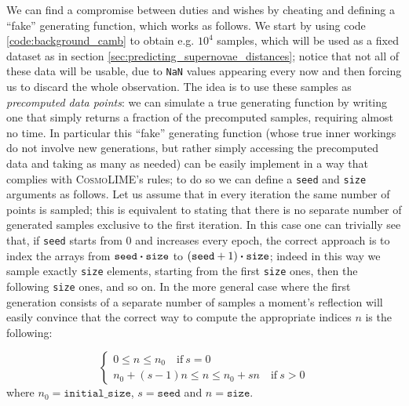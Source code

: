 We can find a compromise between duties and wishes by cheating and defining a ``fake'' generating function, which works as follows.
We start by using code \ref{code:background_camb} to obtain e.g. $10^4$ samples, which will be used as a fixed dataset as in section \ref{sec:predicting_supernovae_distances}; notice that not all of these data will be usable, due to \texttt{NaN} values appearing every now and then forcing us to discard the whole observation.
The idea is to use these samples as \emph{precomputed data points}: we can simulate a true generating function by writing one that simply returns a fraction of the precomputed samples, requiring almost no time.
In particular this ``fake'' generating function (whose true inner workings do not involve new generations, but rather simply accessing the precomputed data and taking as many as needed) can be easily implement in a way that complies with \textsc{CosmoLIME}'s rules; to do so we can define a \texttt{seed} and \texttt{size} arguments as follows.
Let us assume that in every iteration the same number of points is sampled; this is equivalent to stating that there is no separate number of generated samples exclusive to the first iteration. In this case one can trivially see that, if \texttt{seed} starts from $0$ and increases every epoch, the correct approach is to index the arrays from $\texttt{seed}\vdot \texttt{size}$ to $(\texttt{seed}+1)\vdot\texttt{size}$; indeed in this way we sample exactly \texttt{size} elements, starting from the first \texttt{size} ones, then the following \texttt{size} ones, and so on.
In the more general case where the first generation consists of a separate number of samples a moment's reflection will easily convince that the correct way to compute the appropriate indices $n$ is the following:

\begin{equation*}
    \begin{cases}
        0\leq n \leq n_0 \quad \text{if} \ s = 0\\
        n_0 + (s-1)n\leq n \leq n_0 + s n \quad \text{if} \ s > 0
    \end{cases}
\end{equation*}
where $n_0 = \texttt{initial\_size}$, $s = \texttt{seed}$ and $n = \texttt{size}$.

